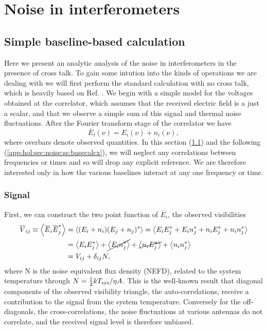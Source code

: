 \section{Noise in interferometers}
\label{app:hol:sec:noise}

\subsection{Simple baseline-based calculation} 
\label{app:hol:sec:noise:ss:basecalc}

Here we present an analytic analysis of the noise in interferometers in the presence of cross talk. To gain some intution into the kinds of operations we are dealing with we will first perform the standard calculation with no cross talk, which is heavily based on Ref. \citep{kulkarni}. We begin with a simple model for the voltages obtained at the correlator, which assumes that the received electric field is a just a scalar, and that we observe a simple sum of this signal and thermal noise fluctuations. After the Fourier transform stage of the correlator we have
\begin{equation}
\overline{E}_i(\nu) = E_i(\nu)+ n_i(\nu),
\end{equation}
where overbars denote observed quantities. In this section (\ref{app:hol:sec:noise:ss:basecalc}) and the following (\ref{app:hol:sec:noise:ss:basecalcx}), we will neglect any correlations between frequencies or times and so will drop any explicit reference. We are therefore interested only in how the various baselines interact at any one frequency or time. %
\subsubsection{Signal}
First, we can construct the two point function of $\overline{E}_i$, the observed visibilities
\begin{align}
\overline{V}_{ij} \equiv \left\langle \overline{E}_i \overline{E}_j^* \right\rangle &= \left\langle (E_i + n_i)(E_j + n_j)^* \right\rangle = \left\langle E_iE_j^* + E_in_j^* + n_iE_j^* + n_in_j^*\right\rangle \nonumber \\ 
&= \left\langle E_iE_j^* \right\rangle + \cancel{\left\langle E_in_j^* \right\rangle} + \cancel{\left\langle n_iE_j^*\right\rangle} +\left\langle n_in_j^* \right\rangle
\nonumber \\ 
&= V_{ij} + \delta_{ij} N, \label{obsvis}
\end{align}
where N is the noise equivalent flux density (NEFD), related to the system temperature through $N=\frac{1}{2}kT_{\rm sys} / \eta A$. This is the well-known result that diagonal components of the observed visibility triangle, the auto-correlations, receive a contribution to the signal from the system temperature. Conversely for the off-diagonals, the cross-correlations, the noise fluctuations at various antennas do not correlate, and the received signal level is therefore unbiased.
